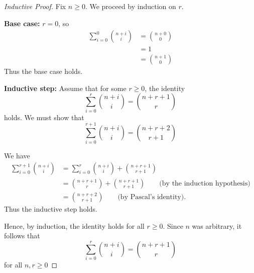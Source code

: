 \documentclass{article}
\begin{document}
\begin{proof}[Inductive Proof]
    Fix $n \ge 0$. We proceed by induction on $r$.

    \medskip

    \textbf{Base case:} $r = 0$, so
    \[
    \begin{aligned}
    \sum_{i=0}^{0}\binom{n + i}{i} &= \binom{n + 0}{0} \\
    &= 1 \\
    &= \binom{n + 1}{0}
    \end{aligned}
    \]
    Thus the base case holds.

    \medskip

    \textbf{Inductive step:} Assume that for some $r \ge 0$, the identity
    \[
    \sum_{i=0}^{r}\binom{n + i}{i} = \binom{n + r + 1}{r}
    \]
    holds. We must show that
    \[
    \sum_{i=0}^{r+1}\binom{n + i}{i} = \binom{n + r + 2}{r + 1}
    \]

    \medskip

    We have
    \[
    \begin{aligned}
    \sum_{i=0}^{r+1}\binom{n + i}{i} &= \sum_{i=0}^{r}\binom{n + i}{i} + \binom{n + r + 1}{r + 1} \\
    &= \binom{n + r + 1}{r} + \binom{n + r + 1}{r + 1} \qquad \text{(by the induction hypothesis)} \\
    &= \binom{n + r + 2}{r + 1} \qquad \text{(by Pascal's identity).}
    \end{aligned}
    \]
    Thus the inductive step holds.

    \medskip

    Hence, by induction, the identity holds for all $r \ge 0$. Since $n$ was arbitrary, it follows that
    \[
    \sum_{i=0}^{r}\binom{n + i}{i} = \binom{n + r + 1}{r}
    \]
    for all $n, r \ge 0$
\end{proof}
\end{document}
